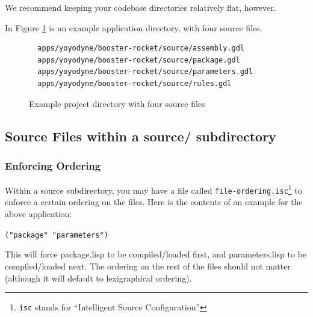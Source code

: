 \documentclass [11pt]{book}
\begin{document}
We recommend keeping your codebase directories relatively flat,
however.



In Figure 
\ref{fig:yoyodyne-base} is an example application directory, with four source files.


\begin{figure}
\begin{lrbox}{\boxedverb}
\begin{minipage}{\linewidth}

\begin{verbatim}
  apps/yoyodyne/booster-rocket/source/assembly.gdl
  apps/yoyodyne/booster-rocket/source/package.gdl
  apps/yoyodyne/booster-rocket/source/parameters.gdl
  apps/yoyodyne/booster-rocket/source/rules.gdl

\end{verbatim}
\end{minipage}
\end{lrbox}
\fbox{\usebox{\boxedverb}}

\caption{Example project directory with four source files}

\label{fig:yoyodyne-base}

\end{figure}


\subsection{Source Files within a source/ subdirectory}

\label{subsec:sourcefileswithinasource/subdirectory}



\subsubsection{Enforcing Ordering}

\label{subsubsec:enforcingordering}



Within a source subdirectory, you may have a file called \texttt{file-ordering.isc}\footnote{\texttt{isc} stands for ``Intelligent Source Configuration''} to enforce a certain ordering on the files. Here is the contents of an example for the 
above application:



\texttt{("package" "parameters")}



This will force package.lisp to be compiled/loaded first, and
parameters.lisp to be compiled/loaded next. The ordering on the rest
of the files should not matter (although it will default to
lexigraphical ordering).
\end{document}
